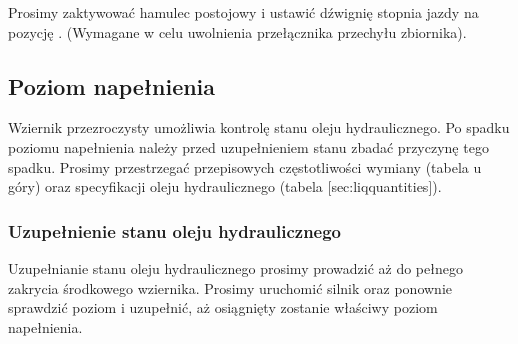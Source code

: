 \stopsection



\item Prosimy zaktywować hamulec postojowy i ustawić dźwignię stopnia jazdy na pozycję . (Wymagane w celu uwolnienia przełącznika przechyłu zbiornika).



\subsection[niveau_hydrau]{Poziom napełnienia}

Wziernik przezroczysty umożliwia kontrolę stanu oleju hydraulicznego.
Po spadku poziomu napełnienia należy przed uzupełnieniem stanu zbadać przyczynę tego spadku. Prosimy przestrzegać przepisowych częstotliwości wymiany (tabela u góry) oraz specyfikacji oleju hydraulicznego (tabela [sec:liqquantities]).


\subsubsection{Uzupełnienie stanu oleju hydraulicznego}

Uzupełnianie stanu oleju hydraulicznego prosimy prowadzić aż do pełnego zakrycia środkowego wziernika.
Prosimy uruchomić silnik oraz ponownie sprawdzić poziom i uzupełnić, aż osiągnięty zostanie właściwy poziom napełnienia.
